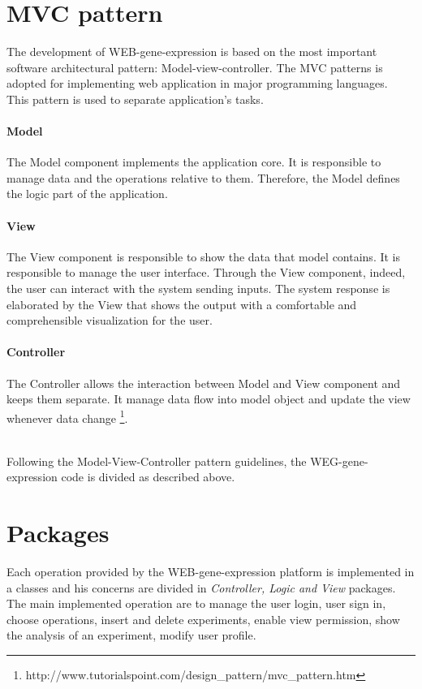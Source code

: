 \documentclass[a4paper]{report}
\begin{document}
\section{MVC pattern} \label{mvc}

The development of WEB-gene-expression is based on the most important software architectural pattern: Model-view-controller. The MVC patterns is adopted for implementing web application in major programming languages.\\
This pattern is used to separate application's tasks.


  \paragraph{Model} The Model component implements the application core. It is responsible to manage data and the operations relative to them. Therefore, the Model defines the logic part of the application.
  \paragraph{View} The View component is responsible to show the data that model contains. It is responsible to manage the user interface. Through the View component, indeed, the user can interact with the system sending inputs. The system response is elaborated by the View that shows the output with a comfortable and comprehensible visualization for the user.
  \paragraph{Controller} The Controller allows the interaction between Model and View component and keeps them separate. It manage data flow into model object and update the view whenever data change \footnote{http://www.tutorialspoint.com/design\_pattern/mvc\_pattern.htm}.  

\
\\Following the Model-View-Controller pattern guidelines, the WEG-gene-expression code is divided as described above.

\section{Packages}

Each operation provided by the WEB-gene-expression platform is implemented in a classes and his concerns are divided in \emph{Controller, Logic and View} packages. 
The main implemented operation are to manage the user login, user sign in, choose operations, insert and delete experiments, enable view permission, show the analysis of an experiment, modify user profile.
\end{document}
